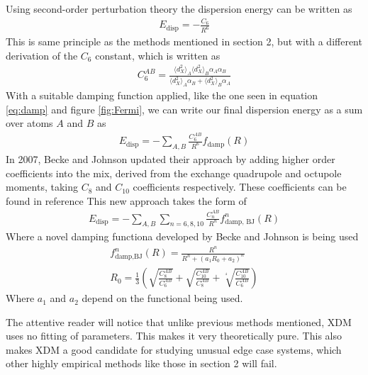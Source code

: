 \documentclass[10pt,a4paper,twocolumn,twoside]{extarticle}
\begin{document}
	Using second-order perturbation theory\cite{XDM-dipole} the dispersion energy can be written as 
	\begin{align}
		E_\text{disp} = -\frac{C_6}{R^6}
	\end{align}
	This is same principle as the methods mentioned in section 2, but with a different derivation of the $C_6$ constant, which is written as
	\begin{align}
		C_6^{AB} = \frac{\langle d_X^2 \rangle_A \langle d_X^2 \rangle_B \alpha_A \alpha_B}{\langle d_X^2 \rangle_A\alpha_B + \langle d_X^2 \rangle_B\alpha_A}
	\end{align} 
	With a suitable damping function applied, like the one seen in equation \ref{eq:damp} and figure \ref{fig:Fermi}, we can write our final dispersion energy as a sum over atoms $A$ and $B$ as 
	\begin{align}
		E_\text{disp} = - \sum_{A,B} \frac{C_6^{AB}}{R^6} f_\text{damp}(R)
	\end{align}
	In 2007, Becke and Johnson updated their approach\cite{XDM-Revisited} by adding higher order coefficients into the mix, derived from the exchange quadrupole and octupole moments, taking $C_8$ and $C_{10}$ coefficients respectively. These coefficients can be found in reference \cite{XDM-Revisited} This new approach takes the form of 
	\begin{align}
		E_\text{disp} = -\sum_{A,B} \sum_{n=6,8,10} \frac{C_n^{AB}}{R^n} f^n_\text{damp, BJ}(R)
	\end{align}
	Where a novel damping functiona developed by Becke and Johnson is being used \cite{BJ-Damp}
	\begin{align}
		\label{eq:BJ-Damp}
		f^n_\text{damp,BJ} (R) = \frac{R^n}{R^n + (a_1 R_0 + a_2)^n}\\
		R_0 = \frac{1}{3} \left( \sqrt{\frac{C_8^{AB}}{C_6^{AB}}} + \sqrt{\frac{C_{10}^{AB}}{C_8^{AB}}}
		+ \sqrt[^4]{\frac{C_{10}^{AB}}{C_6^{AB}}} \right)
	\end{align}
	Where $a_1$ and $a_2$ depend on the functional being used.
	
	The attentive reader will notice that unlike previous methods mentioned, XDM uses no fitting of parameters. This makes it very theoretically pure. This also makes XDM a good candidate for studying unusual edge case systems, which other highly empirical methods like those in section 2 will fail. 


\end{document}
